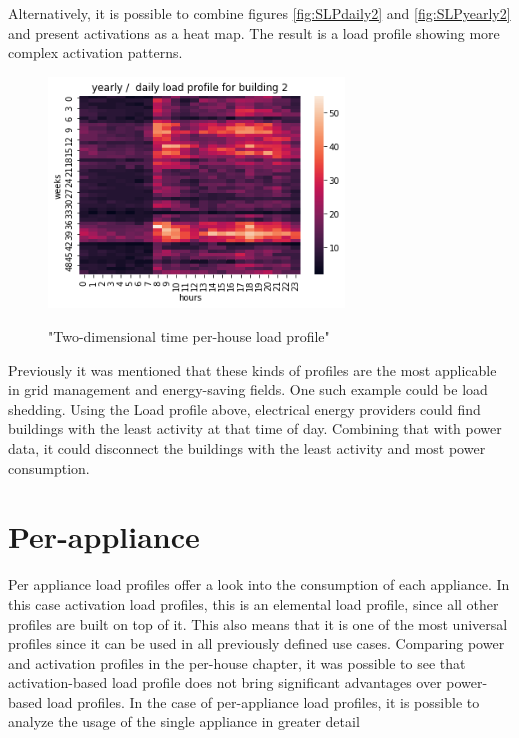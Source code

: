 Alternatively, it is possible to combine figures \ref{fig:SLPdaily2} and \ref{fig:SLPyearly2} and present activations as a heat map.
The result is a load profile showing more complex activation patterns.

\begin{figure}[H]
	\centering
	\caption{"Two-dimensional time per-house load profile"}
	\includegraphics[width=0.7\textwidth]{../Figures/LPS/SLPHMyearly2.png}
	\label{fig:SLPHMyearly2}
\end{figure}

Previously it was mentioned that these kinds of profiles are the most applicable in grid management and energy-saving fields. 
One such example could be load shedding.
Using the Load profile above, electrical energy providers could find buildings with the least activity at that time of day.
Combining that with power data, it could disconnect the buildings with the least activity and most power consumption.

\section{Per-appliance}

Per appliance load profiles offer a look into the consumption of each appliance. 
In this case activation load profiles, this is an elemental load profile, since all other 
profiles are built on top of it. 
This also means that it is one of the most universal profiles since it can be used in all previously defined use cases.
Comparing power and activation profiles in the per-house chapter,
it was possible to see that activation-based load profile does not bring significant advantages over power-based load profiles.
In the case of per-appliance load profiles, it is possible to analyze the usage of the single appliance in greater detail

